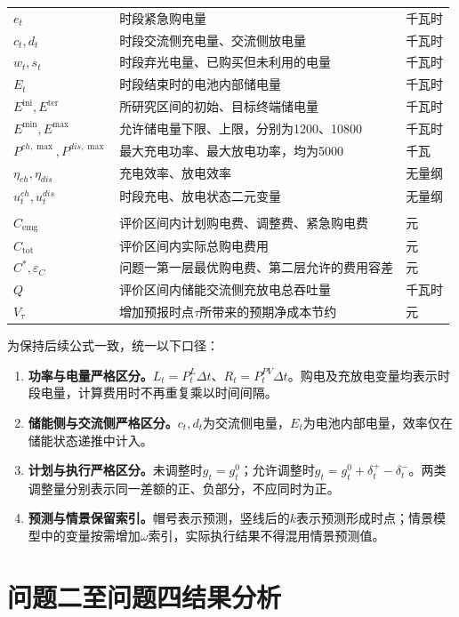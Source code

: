 \documentclass[UTF8,a4paper,12pt,fontset=fandol]{ctexart}
\numberwithin{equation}{section}
\begin{document}
\begin{longtable}{>{\raggedright\arraybackslash}p{}>{\raggedright\arraybackslash}p{}>{\raggedright\arraybackslash}p{}}
$e_t$ & 时段紧急购电量 & 千瓦时\\
$c_t,d_t$ & 时段交流侧充电量、交流侧放电量 & 千瓦时\\
$w_t,s_t$ & 时段弃光电量、已购买但未利用的电量 & 千瓦时\\
$E_t$ & 时段结束时的电池内部储电量 & 千瓦时\\
$E^{\mathrm{ini}},E^{\mathrm{ter}}$ & 所研究区间的初始、目标终端储电量 & 千瓦时\\
$E^{\min},E^{\max}$ & 允许储电量下限、上限，分别为1200、10800 & 千瓦时\\
$P^{ch,\max},P^{dis,\max}$ & 最大充电功率、最大放电功率，均为5000 & 千瓦\\
$\eta_{ch},\eta_{dis}$ & 充电效率、放电效率 & 无量纲\\
$u_t^{ch},u_t^{dis}$ & 时段充电、放电状态二元变量 & 无量纲\\
\shortstack[l]{$C_{\mathrm{plan}},C_{\mathrm{adj}}$\\$C_{\mathrm{emg}}$} & 评价区间内计划购电费、调整费、紧急购电费 & 元\\
$C_{\mathrm{tot}}$ & 评价区间内实际总购电费用 & 元\\
$C^*,\varepsilon_C$ & 问题一第一层最优购电费、第二层允许的费用容差 & 元\\
$Q$ & 评价区间内储能交流侧充放电总吞吐量 & 千瓦时\\
$V_\tau$ & 增加预报时点$\tau$所带来的预期净成本节约 & 元\\
\end{longtable}
\endgroup

为保持后续公式一致，统一以下口径：
\begin{enumerate}
\item \textbf{功率与电量严格区分。}$L_t=P_t^L\Delta t$、$R_t=P_t^{PV}\Delta t$。购电及充放电变量均表示时段电量，计算费用时不再重复乘以时间间隔。
\item \textbf{储能侧与交流侧严格区分。}$c_t,d_t$为交流侧电量，$E_t$为电池内部电量，效率仅在储能状态递推中计入。
\item \textbf{计划与执行严格区分。}未调整时$g_t=g_t^0$；允许调整时$g_t=g_t^0+\delta_t^+-\delta_t^-$。两类调整量分别表示同一差额的正、负部分，不应同时为正。
\item \textbf{预测与情景保留索引。}帽号表示预测，竖线后的$k$表示预测形成时点；情景模型中的变量按需增加$\omega$索引，实际执行结果不得混用情景预测值。
\end{enumerate}

\section{问题二至问题四结果分析}
\label{sec:q234-results}
\end{document}
